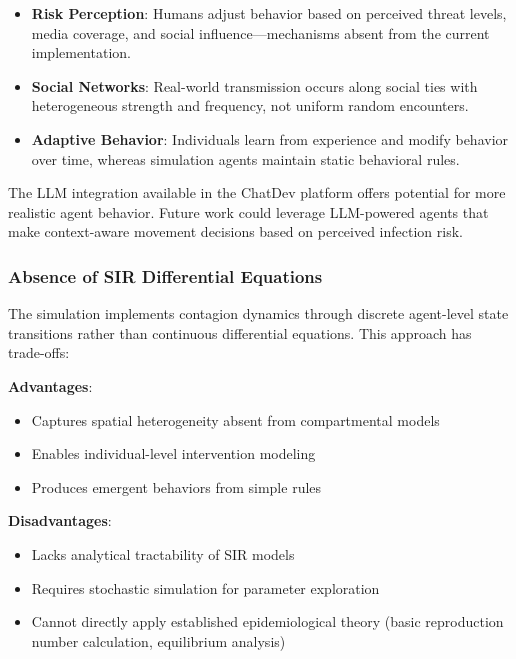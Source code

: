 \begin{itemize}
    \item \textbf{Risk Perception}: Humans adjust behavior based on perceived threat levels, media coverage, and social influence---mechanisms absent from the current implementation.
    
    \item \textbf{Social Networks}: Real-world transmission occurs along social ties with heterogeneous strength and frequency, not uniform random encounters.
    
    \item \textbf{Adaptive Behavior}: Individuals learn from experience and modify behavior over time, whereas simulation agents maintain static behavioral rules.
\end{itemize}

The LLM integration available in the ChatDev platform offers potential for more realistic agent behavior. Future work could leverage LLM-powered agents that make context-aware movement decisions based on perceived infection risk.

\subsubsection{Absence of SIR Differential Equations}

The simulation implements contagion dynamics through discrete agent-level state transitions rather than continuous differential equations. This approach has trade-offs:

\textbf{Advantages}:
\begin{itemize}
    \item Captures spatial heterogeneity absent from compartmental models
    \item Enables individual-level intervention modeling
    \item Produces emergent behaviors from simple rules
\end{itemize}

\textbf{Disadvantages}:
\begin{itemize}
    \item Lacks analytical tractability of SIR models
    \item Requires stochastic simulation for parameter exploration
    \item Cannot directly apply established epidemiological theory (basic reproduction number calculation, equilibrium analysis)
\end{itemize}

